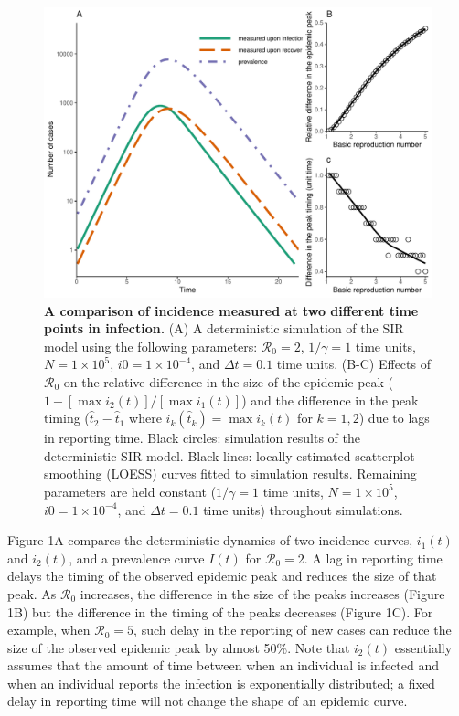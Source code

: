 \documentclass[12pt]{article}\usepackage[]{graphicx}\usepackage[]{color}
\begin{document}
\begin{figure}[!t]
\includegraphics[width=\textwidth]{../figure/example.pdf}
\caption{
\textbf{A comparison of incidence measured at two different time points in infection.}
(A) 
A deterministic simulation of the SIR model using the following parameters: 
$\mathcal R_0 = 2$, $1/\gamma = 1$ time units, $N = 1 \times 10^5$, $i0 = 1 \times 10^{-4}$,
and $\Delta t = 0.1$ time units.
(B-C) Effects of $\mathcal R_0$ on the relative difference in the size of the epidemic peak ($1 - [\max i_2(t)]/[\max i_1(t)]$) and the difference in the peak timing ($\hat{t}_2 - \hat{t}_1$ where $i_k(\hat{t}_k) = \max i_k(t)$ for $k = 1, 2$) due to lags in reporting time. 
Black circles: simulation results of the deterministic SIR model.
Black lines: locally estimated scatterplot smoothing (LOESS) curves fitted to simulation results.
Remaining parameters are held constant ($1/\gamma = 1$ time units, $N = 1 \times 10^5$, $i0 = 1 \times 10^{-4}$, and $\Delta t = 0.1$ time units) throughout simulations.
}
\end{figure}

Figure 1A compares the deterministic dynamics of two incidence curves,
$i_1(t)$ and $i_2(t)$, and a prevalence curve $I(t)$ for $\mathcal R_0 = 2$. 
A lag in reporting time delays
the timing of the observed epidemic peak and reduces the size of that peak.
As $\mathcal R_0$ increases, the difference in the size of the peaks increases (Figure 1B)
but the difference in the timing of the peaks decreases (Figure 1C).
For example, when $\mathcal R_0 = 5$, such delay in the reporting of new cases can reduce the size of the observed epidemic peak by almost 50\%.
Note that $i_2(t)$ essentially assumes that the amount of time between when an individual is infected and when an individual reports the infection is exponentially distributed; a fixed delay in reporting time will not change the shape of an epidemic curve.
\end{document}
